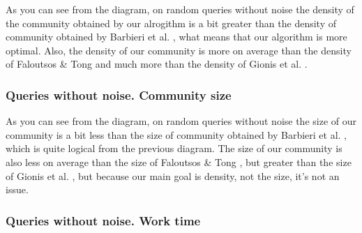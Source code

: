 As you can see from the diagram, on random queries without noise the density of the community obtained by our alrogithm is a bit greater than the density of community obtained by Barbieri et al. \cite{Barbieri15}, what means that our algorithm is more optimal. Also, the density of our community is more on average than the density of Faloutsos \& Tong \cite{Faloutsos06} and much more than the density of Gionis et al. \cite{Gionis15}.

\subsubsection{Queries without noise. Community size}

  \begin{center}
  \end{center}

As you can see from the diagram, on random queries without noise the size of our community is a bit less than the size of community obtained by Barbieri et al. \cite{Barbieri15}, which is quite logical from the previous diagram. The size of our community is also less on average than the size of Faloutsos \& Tong \cite{Faloutsos06}, but greater than the size of Gionis et al. \cite{Gionis15}, but because our main goal is density, not the size, it's not an issue.

\subsubsection{Queries without noise. Work time}

